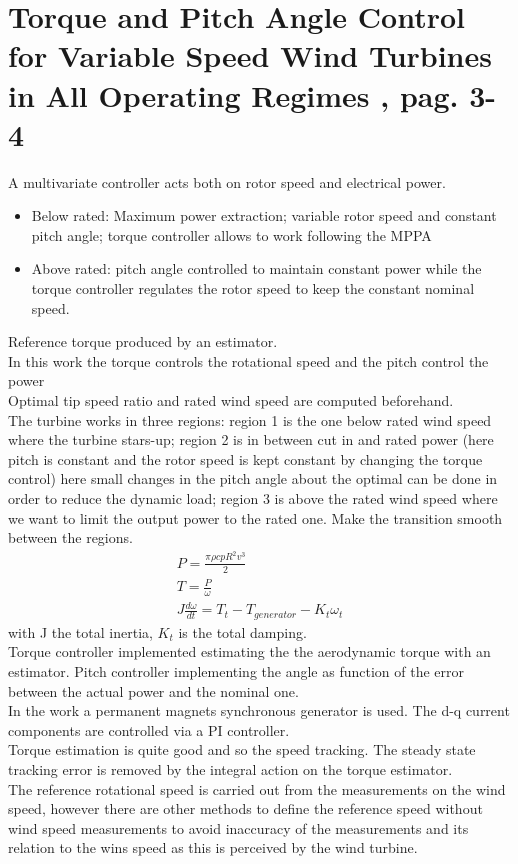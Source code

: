 \documentclass[]{article}
\begin{document}
\tableofcontents
\section{Torque and Pitch Angle Control for Variable Speed Wind Turbines in All Operating Regimes \cite{5874598}, pag. 3-4}
A multivariate controller acts both on rotor speed and electrical power. 
\begin{itemize}
	\item Below rated: Maximum power extraction; variable rotor speed and constant pitch angle; torque controller allows to work following the MPPA
	\item Above rated: pitch angle controlled to maintain constant power while the torque controller regulates the rotor speed to keep the constant nominal speed. 
\end{itemize}
Reference torque produced by an estimator.\\
In this work the torque controls the rotational speed and the pitch control the power\\
Optimal tip speed ratio and rated wind speed are computed beforehand. \\
The turbine works in three regions: region 1 is the one below rated wind speed where the turbine stars-up; region 2 is in between cut in and rated power (here pitch is constant and the rotor speed is kept constant by changing the torque control) here small changes in the pitch angle about the optimal can be done in order to reduce the dynamic load; region 3 is above the rated wind speed where we want to limit the output power to the rated one. Make the transition smooth between the regions. \\
\begin{gather}
	P = \frac{\pi \rho cp R^2 v^3}{2}\\
	T = \frac{P}{\omega}\\
	J \frac{d \omega}{d t} = T_{t} - T_{generator} -K_t\omega_t
	\label{eq:dynamic_rotor_gen}
\end{gather}
with J the total inertia, $K_t$ is the total damping.\\
Torque controller implemented estimating the the aerodynamic torque with an estimator. Pitch controller implementing the angle as function of the error between the actual power and the nominal one.\\
In the work a permanent magnets synchronous generator is used. The d-q current components are controlled via a PI controller. \\
Torque estimation is quite good and so the speed tracking. The steady state tracking error is removed by the integral action on the torque estimator.\\
The reference rotational speed is carried out from the measurements on the wind speed, however there are other methods to define the reference speed without wind speed measurements to avoid inaccuracy of the measurements and its relation to the wins speed as this is perceived by the wind turbine.
\end{document}
